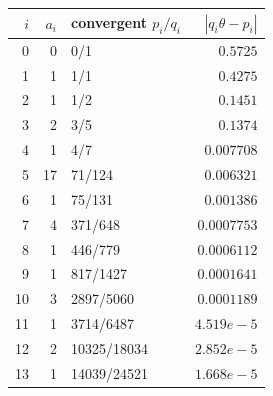 \begin{tabular}{@{}rrlr@{}}\toprule
$i$ & $a_i$ & convergent $p_i/q_i$ & $|q_i\theta-p_i|$\\\midrule
0 & 0 & 0/1 & $0.5725$ \\
1 & 1 & 1/1 & $0.4275$ \\
2 & 1 & 1/2 & $0.1451$ \\
3 & 2 & 3/5 & $0.1374$ \\
4 & 1 & 4/7 & $0.007708$ \\
5 & 17 & 71/124 & $0.006321$ \\
6 & 1 & 75/131 & $0.001386$ \\
7 & 4 & 371/648 & $0.0007753$ \\
8 & 1 & 446/779 & $0.0006112$ \\
9 & 1 & 817/1427 & $0.0001641$ \\
10 & 3 & 2897/5060 & $0.0001189$ \\
11 & 1 & 3714/6487 & $4.519e-5$ \\
12 & 2 & 10325/18034 & $2.852e-5$ \\
13 & 1 & 14039/24521 & $1.668e-5$ \\
\bottomrule\end{tabular}
